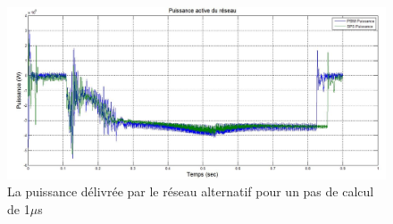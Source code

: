 \begin{figure}[htb]
\centering
\includegraphics[scale=0.5]{fig/DCP_AFE/1u/PUI.jpg}
\caption{La puissance délivrée par le réseau alternatif pour un pas de calcul de 1$\mu$s}
\label{AF_DC_CHA1}
\end{figure}
